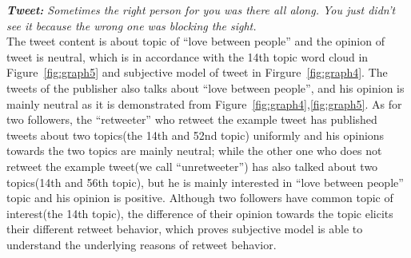 \documentclass[preprint,times]{elsarticle}
\begin{document}
\textit{\textbf{Tweet:} Sometimes the right person for you was there all along. You just didn’t see it because the wrong one was blocking the sight.}\\
The tweet content is about topic of ``love between people'' and the opinion of tweet is neutral, which is in accordance with the 14th topic word cloud in Figure~\ref{fig:graph5} and subjective model of tweet in Firgure~\ref{fig:graph4}.
The tweets of the publisher also talks about ``love between people'', and his opinion is mainly neutral as it is demonstrated from Figure~\ref{fig:graph4},\ref{fig:graph5}.
As for two followers, the ``retweeter'' who retweet the example tweet has published tweets about two topics(the 14th and 52nd topic) uniformly and his opinions towards the two topics are mainly neutral;
while the other one who does not retweet the example tweet(we call ``unretweeter'') has also talked about two topics(14th and 56th topic), but he is mainly interested in ``love between people'' topic and his opinion is positive.
Although two followers have common topic of interest(the 14th topic), the difference of their opinion towards the topic elicits their different retweet behavior, which proves subjective model is able to understand the underlying reasons of retweet behavior.
\end{document}
